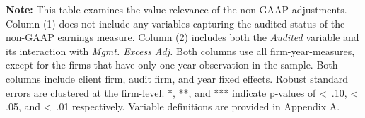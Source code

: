\documentclass[12pt,fleqn]{article}
\begin{document}
\clearpage
\begin{table}[!htbp] 
    \begin{threeparttable}[b]
        \captionsetup{labelfont = bf, singlelinecheck = off, justification = raggedright, labelsep = none}   
        \caption{\\Are Audited Non-GAAP Earnings More Value Relevant?}
        \small

        \begin{flushleft}
           {\raggedright
           
           \par}
        \end{flushleft}
        \vspace{-6mm}
        
        \begin{tablenotes}
            \scriptsize
            \item \textbf{Note:} This table examines the value relevance of the non-GAAP adjustments. Column (1) does not include any variables capturing the audited status of the non-GAAP earnings measure. Column (2) includes both the \textit{Audited} variable and its interaction with \textit{Mgmt. Excess Adj.} Both columns use all firm-year-measures, except for the firms that have only one-year observation in the sample. Both columns include client firm, audit firm, and year fixed effects. Robust standard errors are clustered at the firm-level. *, **, and *** indicate p-values of \textless\, .10, \textless\, .05, and \textless\, .01 respectively. Variable definitions are provided in Appendix A.
        \end{tablenotes}
        \label{table:valrel}
    \end{threeparttable}
\end{table}
\end{document}
